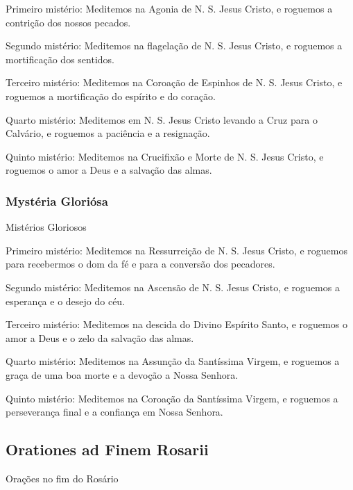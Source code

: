 {\redx Primeiro mistério:} Meditemos na Agonia de N. S. Jesus Cristo, e roguemos a contrição dos nossos pecados.\par
{\redx Segundo mistério:} Meditemos na flagelação de N. S. Jesus Cristo, e roguemos a mortificação dos sentidos.\par
{\redx Terceiro mistério:} Meditemos na Coroação de Espinhos de N. S. Jesus Cristo, e roguemos a mortificação do espírito e do coração.\par
{\redx Quarto mistério:} Meditemos em N. S. Jesus Cristo levando a Cruz para o Calvário, e roguemos a paciência e a resignação.\par
{\redx Quinto mistério:} Meditemos na Crucifixão e Morte de N. S. Jesus Cristo, e roguemos o amor a Deus e a salvação das almas.

\subsubsection{Mystéria Gloriósa}
\begin{nscenter}Mistérios Gloriosos\end{nscenter}
\begin{nscenter}\emph{}\end{nscenter}

{\redx Primeiro mistério:} Meditemos na Ressurreição de N. S. Jesus Cristo, e roguemos para recebermos o dom da fé e para a conversão dos pecadores.\par
{\redx Segundo mistério:} Meditemos na Ascensão de N. S. Jesus Cristo, e roguemos a esperança e o desejo do céu.\par
{\redx Terceiro mistério:} Meditemos na descida do Divino Espírito Santo, e roguemos o amor a Deus e o zelo da salvação das almas.\par
{\redx Quarto mistério:} Meditemos na Assunção da Santíssima Virgem, e roguemos a graça de uma boa morte e a devoção a Nossa Senhora.\par
{\redx Quinto mistério:} Meditemos na Coroação da Santíssima Virgem, e roguemos a perseverança final e a confiança em Nossa Senhora.

\subsection{Orationes ad Finem Rosarii}
\begin{nscenter}Orações no fim do Rosário\end{nscenter}

